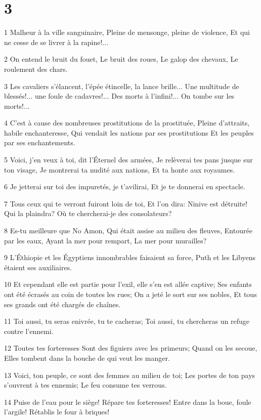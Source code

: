 \chapter{3}

\par 1 Malheur à la ville sanguinaire, Pleine de mensonge, pleine de violence, Et qui ne cesse de se livrer à la rapine!...
\par 2 On entend le bruit du fouet, Le bruit des roues, Le galop des chevaux, Le roulement des chars.
\par 3 Les cavaliers s'élancent, l'épée étincelle, la lance brille... Une multitude de blessés!... une foule de cadavres!... Des morts à l'infini!... On tombe sur les morts!...
\par 4 C'est à cause des nombreuses prostitutions de la prostituée, Pleine d'attraits, habile enchanteresse, Qui vendait les nations par ses prostitutions Et les peuples par ses enchantements.
\par 5 Voici, j'en veux à toi, dit l'Éternel des armées, Je relèverai tes pans jusque sur ton visage, Je montrerai ta nudité aux nations, Et ta honte aux royaumes.
\par 6 Je jetterai sur toi des impuretés, je t'avilirai, Et je te donnerai en spectacle.
\par 7 Tous ceux qui te verront fuiront loin de toi, Et l'on dira: Ninive est détruite! Qui la plaindra? Où te chercherai-je des consolateurs?
\par 8 Es-tu meilleure que No Amon, Qui était assise au milieu des fleuves, Entourée par les eaux, Ayant la mer pour rempart, La mer pour murailles?
\par 9 L'Éthiopie et les Égyptiens innombrables faisaient sa force, Puth et les Libyens étaient ses auxiliaires.
\par 10 Et cependant elle est partie pour l'exil, elle s'en est allée captive; Ses enfants ont été écrasés au coin de toutes les rues; On a jeté le sort sur ses nobles, Et tous ses grands ont été chargés de chaînes.
\par 11 Toi aussi, tu seras enivrée, tu te cacheras; Toi aussi, tu chercheras un refuge contre l'ennemi.
\par 12 Toutes tes forteresses Sont des figuiers avec les primeurs; Quand on les secoue, Elles tombent dans la bouche de qui veut les manger.
\par 13 Voici, ton peuple, ce sont des femmes au milieu de toi; Les portes de ton pays s'ouvrent à tes ennemis; Le feu consume tes verrous.
\par 14 Puise de l'eau pour le siège! Répare tes forteresses! Entre dans la boue, foule l'argile! Rétablis le four à briques!

